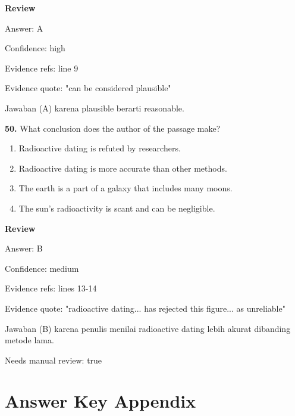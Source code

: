 \documentclass[12pt]{article}
\begin{document}
\setlength{\parindent}{0pt}
\textbf{Review}\par
Answer: A\par
Confidence: high\par
Evidence refs: line 9\par
Evidence quote: "can be considered plausible"\par
Jawaban (A) karena plausible berarti reasonable.\par
\endgroup
\par
\vspace{0.25\baselineskip}
\noindent\textbf{50.} What conclusion does the author of the passage make?
\begin{enumerate}[label=(\Alph*),leftmargin=*,itemsep=0.2em]
\item Radioactive dating is refuted by researchers.
\item Radioactive dating is more accurate than other methods.
\item The earth is a part of a galaxy that includes many moons.
\item The sun's radioactivity is scant and can be negligible.
\end{enumerate}
\par
\begingroup
\setlength{\parskip}{0pt}
\setlength{\parindent}{0pt}
\textbf{Review}\par
Answer: B\par
Confidence: medium\par
Evidence refs: lines 13-14\par
Evidence quote: "radioactive dating... has rejected this figure... as unreliable"\par
Jawaban (B) karena penulis menilai radioactive dating lebih akurat dibanding metode lama.\par
Needs manual review: true\par
\endgroup
\par
\vspace{0.25\baselineskip}
\newpage
\section*{Answer Key Appendix}
\end{document}
